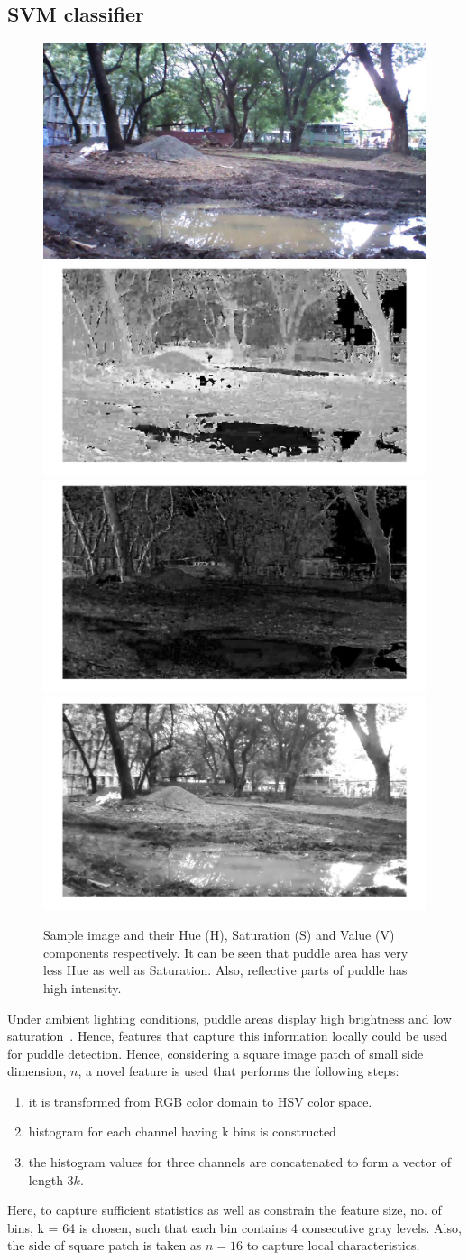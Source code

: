 \documentclass[times,10pt,twocolumn,letterpaper]{article}
\begin{document}
\subsection{SVM classifier}

\begin{figure}[h!]
\centering
\includegraphics[width=0.22\linewidth]{images/IMG_PAIR_1_1.jpg}
\includegraphics[width=0.22\linewidth]{images/IMG_PAIR_1_1_H.jpg}
\includegraphics[width=0.22\linewidth]{images/IMG_PAIR_1_1_S.jpg}
\includegraphics[width=0.22\linewidth]{images/IMG_PAIR_1_1_V.jpg}
\caption{Sample image and their Hue (H), Saturation (S) and Value (V) components
respectively. It can be seen that puddle area has very less Hue as well
as Saturation. Also, reflective parts of puddle has high intensity.}
\label{fig:HSV}
\end{figure}

Under ambient lighting conditions, puddle areas display high brightness and low
saturation~\cite{rankin04}. Hence, features that capture this information locally
could be used for puddle detection. Hence, considering a square image patch of
small side dimension, $n$, a novel feature is used that performs the following
steps:
\begin{enumerate}
\item it is transformed from RGB color domain to HSV color space.
\item histogram for each channel having k bins is constructed
\item the histogram values for three channels are concatenated to form a vector
of length $3k$.
\end{enumerate}
 
Here, to capture sufficient statistics as well as constrain the feature size,
no. of bins, k = 64 is chosen, such that each bin contains 4 consecutive gray
levels. Also, the side of square patch is taken as $n = 16$ to capture local
characteristics.
\end{document}
